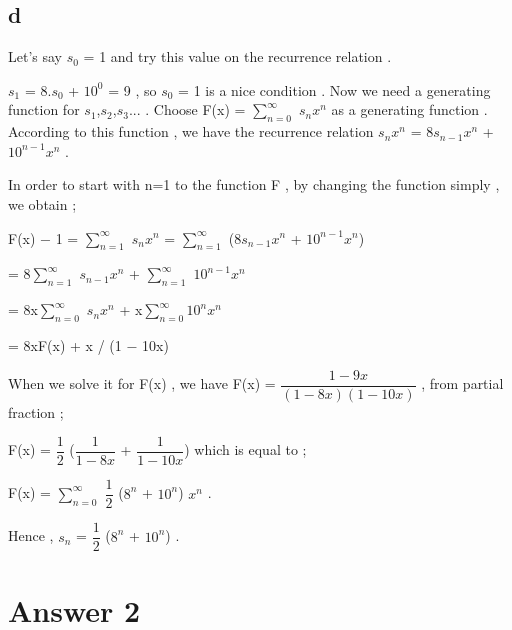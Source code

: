 \documentclass[12pt]{article}
\begin{document}
\subsection*{d}
\hspace{15px} Let's say \textit{$s_0$} = 1 and try this value on the recurrence relation . \par 
\textit{$s_1$} = 8.\textit{$s_0$} + \textit{$10^0$} = 9 , so \textit{$s_0$} = 1 is a nice condition . Now we need a generating function for \textit{$s_1$},\textit{$s_2$},\textit{$s_3$}... . Choose F(x) = $\sum_{n=0}^{\infty}$ \textit{$s_n$}\textit{$x^n$} as a generating function . According to this function , we have the recurrence relation \textit{$s_n$}\textit{$x^n$} = 8\textit{$s_{n-1}$}\textit{$x^n$} + \textit{$10^{n-1}$}\textit{$x^n$} . \par 
In order to start with n=1 to the function F , by changing the function simply , we obtain ; \par 
F(x) \textit{$-$} 1 = $\sum_{n=1}^{\infty}$ \textit{$s_n$}\textit{$x^n$} = $\sum_{n=1}^{\infty}$ (8\textit{$s_{n-1}$}\textit{$x^n$} + \textit{$10^{n-1}$}\textit{$x^n$}) \par 
\hspace{45px} = 8$\sum_{n=1}^{\infty}$ \textit{$s_{n-1}$}\textit{$x^n$} + $\sum_{n=1}^{\infty}$ \textit{$10^{n-1}$}\textit{$x^n$} \par 
\hspace{45px} = 8x$\sum_{n=0}^{\infty}$ \textit{$s_n$}\textit{$x^n$} + x$\sum_{n=0}^{\infty}$\textit{$10^n$}\textit{$x^n$} \par 
\hspace{45px} = 8xF(x) + x / (1 \textit{$-$} 10x) \par 
When we solve it for F(x) , we have F(x) = $\dfrac{1-9x}{(1-8x)(1-10x)}$ , from partial fraction ; \par 
\hspace{45px} F(x) = $\dfrac{1}{2}$ ($\dfrac{1}{1-8x}$ + $\dfrac{1}{1-10x}$) which is equal to ; \par 
\hspace{45px} F(x) = $\sum_{n=0}^{\infty}$ $\dfrac{1}{2}$ (\textit{$8^n$} + \textit{$10^n$}) \textit{$x^n$} . \par 
\hspace{45px} Hence , \textit{$s_n$} = $\dfrac{1}{2}$ (\textit{$8^n$} + \textit{$10^n$}) .
\section*{Answer 2}
\end{document}
